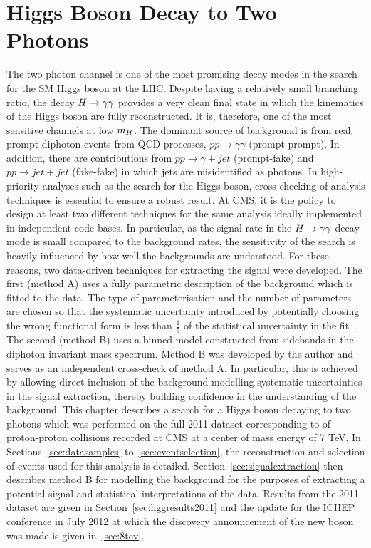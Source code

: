 \chapter{Higgs Boson Decay to Two Photons}
\label{chap:hgg}

The two photon channel is one of the most promising decay modes in 
the search for the SM Higgs boson at the LHC. 
Despite having a relatively small branching ratio, the decay $H\rightarrow\gamma\gamma$ 
provides a very clean final state in which the kinematics of the Higgs boson are 
fully reconstructed. It is, therefore,
one of the most sensitive channels at low $m_{H}$.
The dominant source of background is from real, prompt diphoton events from QCD 
processes, $pp\rightarrow\gamma\gamma$ (prompt-prompt).
In addition, there are contributions from $pp\rightarrow\gamma+jet$ (prompt-fake) and 
$pp\rightarrow jet+jet$ (fake-fake) in which jets are misidentified as photons. 
In high-priority analyses such as the search for the Higgs boson, cross-checking of analysis
techniques is essential to ensure a robust result. At CMS, it is the policy to design at least two 
different techniques for the same analysis ideally implemented in independent code bases.
In particular, as the signal rate in the $H\rightarrow\gamma\gamma$ decay mode is small compared to the background rates,
the sensitivity of the search is heavily influenced by how well the backgrounds are understood.
For these reasons, two data-driven techniques for extracting the signal were developed.
The first (method A) uses a fully parametric description of the background which is fitted to the data. 
The type of parameterisation and the number of parameters are chosen so that the systematic uncertainty 
introduced by potentially choosing the wrong functional form is less than $\frac{\displaystyle 1}{\displaystyle 5}$ 
of the statistical uncertainty in the fit~\citep{HIG-11-033}.
The second (method B) uses a binned model constructed from 
sidebands in the diphoton invariant mass spectrum. 
Method B was developed by the author and serves as an independent 
cross-check of method A. In particular, this is achieved by allowing direct 
inclusion of the background modelling systematic uncertainties in the signal extraction, thereby building 
confidence in the understanding of the background. 
This chapter describes a search for a Higgs boson decaying to two photons
which was performed on the full 2011 dataset corresponding to \clumi of proton-proton collisions 
recorded at CMS at a center of mass energy of 7 TeV.
In Sections~\ref{sec:datasamples} to~\ref{sec:eventselection}, the reconstruction and
selection of events used for this analysis is detailed. Section~\ref{sec:signalextraction} 
then describes method B for modelling the background for the purposes
of extracting a potential signal and statistical interpretations of the data. 
Results from the 2011 dataset are given in Section~\ref{sec:hggresults2011} and the update for the ICHEP conference in July 2012
at which the discovery announcement of the new boson was made is given in~\ref{sec:8tev}.

